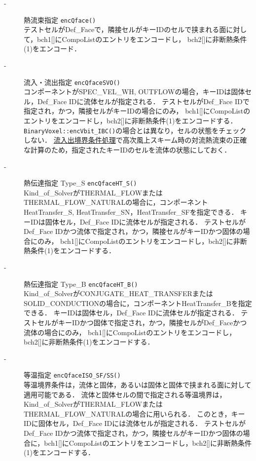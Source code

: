 \begin{enumerate}
\begin{itemize}
\begin{description}
\item[-] 熱流束指定 \verb|encQface()|\\
テストセルがDef\_Faceで，隣接セルがキーIDのセルで挟まれる面に対して，bch1[]にCompoListのエントリをエンコードし，
bch2[]に非断熱条件(1)をエンコード．
\vspace{2mm}

\item[-] 流入・流出指定 \verb|encQfaceSVO()|\\
コンポーネントがSPEC\_VEL\_WH, OUTFLOWの場合，キーIDは固体セル，Def\_Face IDに流体セルが指定される．
テストセルがDef\_Face IDで指定され，かつ，隣接セルがキーIDの場合にのみ，
bch1[]にCompoListのエントリをエンコードし，bch2[]に非断熱条件(1)をエンコードする．\verb|BinaryVoxel::encVbit_IBC()|の場合とは異なり，セルの状態をチェックしない．
\hyperlink{tgt:inflow}{流入出境界条件処理}で高次風上スキーム時の対流熱流束の正確な計算のため，指定されたキーIDのセルを流体の状態にしておく．
\vspace{2mm}

\item[-] 熱伝達指定 Type\_S \verb|encQfaceHT_S()|\\
Kind\_of\_SolverがTHERMAL\_FLOWまたはTHERMAL\_FLOW\_NATURALの場合に，コンポーネントHeatTransfer\_S, HeatTransfer\_SN，HeatTransfer\_SFを指定できる．
キーIDは固体セル，Def\_Face IDに流体セルが指定される．
テストセルがDef\_Face IDかつ流体で指定され，かつ，隣接セルがキーIDかつ固体の場合にのみ，
bch1[]にCompoListのエントリをエンコードし，bch2[]に非断熱条件(1)をエンコードする．
\vspace{2mm}

\item[-] 熱伝達指定 Type\_B \verb|encQfaceHT_B()|\\
Kind\_of\_SolverがCONJUGATE\_HEAT\_TRANSFERまたはSOLID\_CONDUCTIONの場合に，コンポーネントHeatTransfer\_Bを指定できる．
キーIDは固体セル，Def\_Face IDに流体セルが指定される．
テストセルがキーIDかつ固体で指定され，かつ，隣接セルがDef\_Faceかつ流体の場合にのみ，
bch1[]にCompoListのエントリをエンコードし，bch2[]に非断熱条件(1)をエンコードする．
\vspace{2mm}

\item[-] 等温指定 \verb|encQfaceISO_SF/SS()|\\
等温境界条件は，流体と固体，あるいは固体と固体で挟まれる面に対して適用可能である．
流体と固体セルの間で指定される等温境界は，Kind\_of\_SolverがTHERMAL\_FLOWまたはTHERMAL\_FLOW\_NATURALの場合に用いられる．
このとき，キーIDに固体セル，Def\_Face IDには流体セルが指定される．
テストセルがDef\_Face IDかつ流体で指定され，かつ，隣接セルがキーIDかつ固体の場合に，bch1[]にCompoListのエントリをエンコードし，bch2[]に非断熱条件(1)をエンコードする．


\end{description}
\end{itemize}
\end{enumerate}
